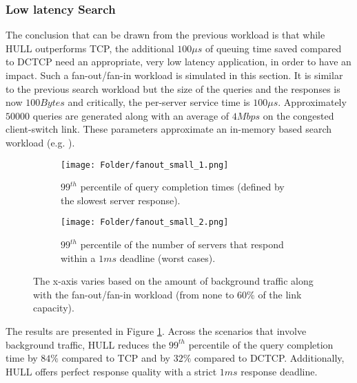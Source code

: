 \documentclass[10pt,conference,compsocconf]{IEEEtran}
\begin{document}
\subsubsection*{\textbf{Low latency Search}}
The conclusion that can be drawn from the previous workload is that while HULL outperforms TCP, the additional $100\mu s$ of queuing time saved compared to DCTCP need an appropriate, very low latency application, in order to have an impact. Such a fan-out/fan-in workload is simulated in this section. It is similar to the previous search workload but the size of the queries and the responses is now $100Bytes$ and critically, the per-server service time is $100\mu s$. Approximately $50000$ queries are generated along with an average of $4Mbps$ on the congested client-switch link. These parameters approximate an in-memory based search workload (e.g. \cite{FB}).
\begin{figure}[ht]
  \centering
  \begin{subfigure}{\linewidth}
    \centering
    \texttt{[image: Folder/fanout\_small\_1.png]}
    \caption{$99^{th}$ percentile of query completion times (defined by the slowest server response).}
  \end{subfigure}

  \begin{subfigure}{\linewidth}
    \centering
    \texttt{[image: Folder/fanout\_small\_2.png]}
    \caption{$99^{th}$ percentile of the number of servers that respond within a $1ms$ deadline (worst cases).}
  \end{subfigure}  

  \setlength{\belowcaptionskip}{-0.4cm} 
  \caption{The x-axis varies based on the amount of background traffic along with the fan-out/fan-in workload (from none to $60\%$ of the link capacity).}  
  \label{fig:fanout_small}
\end{figure} 

The results are presented in Figure \ref{fig:fanout_small}. Across the scenarios that involve background traffic,  HULL reduces the $99^{th}$ percentile of the query completion time by $84\%$ compared to TCP and by $32\%$ compared to DCTCP. Additionally, HULL offers perfect response quality with a strict $1ms$ response deadline.
\end{document}
